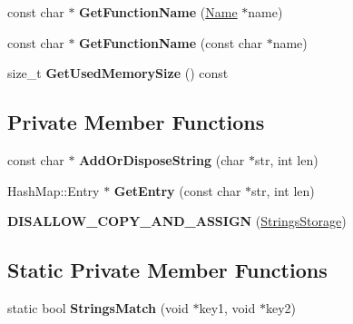 \begin{DoxyCompactItemize}
\item 
const char $\ast$ {\bfseries Get\+Function\+Name} (\hyperlink{classv8_1_1internal_1_1_name}{Name} $\ast$name)\hypertarget{classv8_1_1internal_1_1_strings_storage_a4e8c15f94d933f1d61c5185d377f48e7}{}\label{classv8_1_1internal_1_1_strings_storage_a4e8c15f94d933f1d61c5185d377f48e7}

\item 
const char $\ast$ {\bfseries Get\+Function\+Name} (const char $\ast$name)\hypertarget{classv8_1_1internal_1_1_strings_storage_ade4bb391fe20b2c09190ab1489c1d7e4}{}\label{classv8_1_1internal_1_1_strings_storage_ade4bb391fe20b2c09190ab1489c1d7e4}

\item 
size\+\_\+t {\bfseries Get\+Used\+Memory\+Size} () const \hypertarget{classv8_1_1internal_1_1_strings_storage_a54dd75cdb8c7868cc6ebee2301e99a50}{}\label{classv8_1_1internal_1_1_strings_storage_a54dd75cdb8c7868cc6ebee2301e99a50}

\end{DoxyCompactItemize}
\subsection*{Private Member Functions}
\begin{DoxyCompactItemize}
\item 
const char $\ast$ {\bfseries Add\+Or\+Dispose\+String} (char $\ast$str, int len)\hypertarget{classv8_1_1internal_1_1_strings_storage_a71d8c1172da4e73a6ba4a18d6b573892}{}\label{classv8_1_1internal_1_1_strings_storage_a71d8c1172da4e73a6ba4a18d6b573892}

\item 
Hash\+Map\+::\+Entry $\ast$ {\bfseries Get\+Entry} (const char $\ast$str, int len)\hypertarget{classv8_1_1internal_1_1_strings_storage_aaec322367caeb7981b38309995181734}{}\label{classv8_1_1internal_1_1_strings_storage_aaec322367caeb7981b38309995181734}

\item 
{\bfseries D\+I\+S\+A\+L\+L\+O\+W\+\_\+\+C\+O\+P\+Y\+\_\+\+A\+N\+D\+\_\+\+A\+S\+S\+I\+GN} (\hyperlink{classv8_1_1internal_1_1_strings_storage}{Strings\+Storage})\hypertarget{classv8_1_1internal_1_1_strings_storage_ada0e8f285080e567e5dc2a692fc4ad79}{}\label{classv8_1_1internal_1_1_strings_storage_ada0e8f285080e567e5dc2a692fc4ad79}

\end{DoxyCompactItemize}
\subsection*{Static Private Member Functions}
\begin{DoxyCompactItemize}
\item 
static bool {\bfseries Strings\+Match} (void $\ast$key1, void $\ast$key2)\hypertarget{classv8_1_1internal_1_1_strings_storage_ac2cf761997443bf184838e1a8fca7d07}{}\label{classv8_1_1internal_1_1_strings_storage_ac2cf761997443bf184838e1a8fca7d07}

\end{DoxyCompactItemize}
